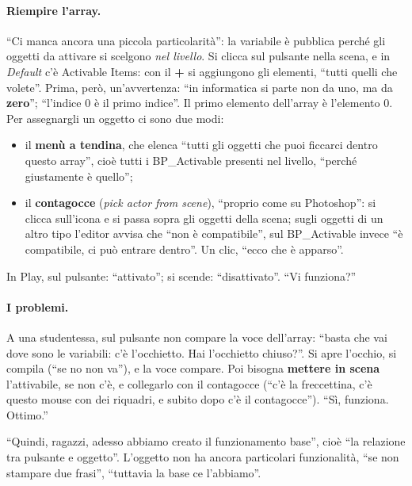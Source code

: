 \paragraph{Riempire l'array.} ``Ci manca ancora una piccola particolarità'': la variabile
è pubblica perché gli oggetti da attivare si scelgono \emph{nel livello}. Si clicca sul
pulsante nella scena, e in \emph{Default} c'è Activable Items: con il \textbf{+} si
aggiungono gli elementi, ``tutti quelli che volete''. Prima, però, un'avvertenza: ``in
informatica si parte non da uno, ma da \textbf{zero}''; ``l'indice 0 è il primo
indice''. Il primo elemento dell'array è l'elemento 0. Per assegnargli un oggetto ci sono
due modi:
\begin{itemize}
  \item il \textbf{menù a tendina}, che elenca ``tutti gli oggetti che puoi ficcarci
        dentro questo array'', cioè tutti i BP\_Activable presenti nel livello, ``perché
        giustamente è quello'';
  \item il \textbf{contagocce} (\emph{pick actor from scene}), ``proprio come su
        Photoshop'': si clicca sull'icona e si passa sopra gli oggetti della scena;
        sugli oggetti di un altro tipo l'editor avvisa che ``non è compatibile'', sul
        BP\_Activable invece ``è compatibile, ci può entrare dentro''. Un clic, ``ecco che
        è apparso''.
\end{itemize}
In Play, sul pulsante: ``attivato''; si scende: ``disattivato''. ``Vi funziona?''

\paragraph{I problemi.} A una studentessa, sul pulsante non compare la voce dell'array:
``basta che vai dove sono le variabili: c'è l'occhietto. Hai l'occhietto chiuso?''. Si
apre l'occhio, si compila (``se no non va''), e la voce compare. Poi bisogna
\textbf{mettere in scena} l'attivabile, se non c'è, e collegarlo con il contagocce
(``c'è la freccettina, c'è questo mouse con dei riquadri, e subito dopo c'è il
contagocce''). ``Sì, funziona. Ottimo.''

``Quindi, ragazzi, adesso abbiamo creato il funzionamento base'', cioè ``la relazione
tra pulsante e oggetto''. L'oggetto non ha ancora particolari funzionalità, ``se non
stampare due frasi'', ``tuttavia la base ce l'abbiamo''.

